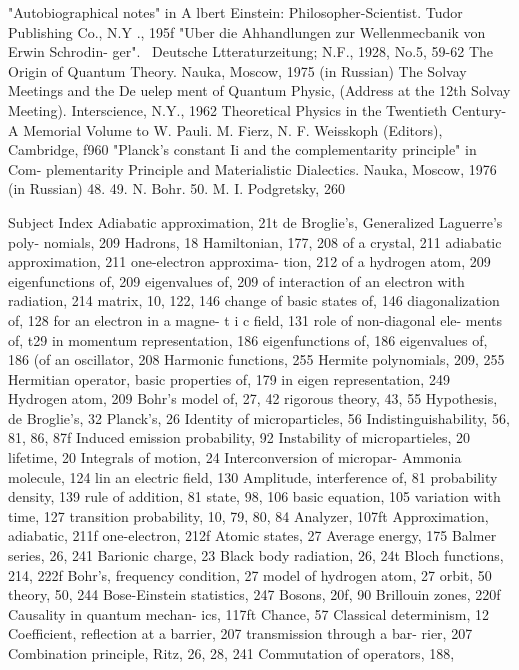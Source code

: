 \documentclass[a4paper,sfsidenotes,colorlinks=true]{tufte-book}
\numberwithin{equation}{section}
\numberwithin{figure}{section}
\begin{document}
{{{{{{{"Autobiographical notes" in A lbert Einstein: Philosopher-Scientist. Tudor	Publishing	Co.,	N.Y .,	195f
"Uber die Ahhandlungen zur Wellenmecbanik von Erwin Schrodin- ger".~ Deutsche Ltteraturzeitung; N.F., 1928, No.5, 59-62
The Origin of Quantum Theory. Nauka, Moscow, 1975 (in Russian) The	Solvay	Meetings	and	the	De uelep ment	of	Quantum	Physic,
(Address at the 12th Solvay Meeting). Interscience, N.Y., 1962
Theoretical Physics in the Twentieth Century-A Memorial Volume to W. Pauli. M. Fierz, N. F. Weisskoph (Editors), Cambridge, f960
"Planck's constant Ii and the complementarity principle" in Com- plementarity Principle and Materialistic Dialectics. Nauka, Moscow, 1976 (in Russian)
48.
49.
N.	Bohr.
50. M. I. Podgretsky,
260

\cleardoublepage
Subject Index
Adiabatic approximation, 21t de Broglie's,
Generalized Laguerre's poly- nomials, 209
Hadrons, 18 Hamiltonian, 177, 208
of a crystal, 211 adiabatic	approximation,
211 one-electron approxima-
tion, 212 of a hydrogen atom, 209
eigenfunctions of, 209
eigenvalues of, 209 of interaction of an electron
with radiation, 214 matrix, 10, 122, 146
change of basic states of, 146
diagonalization of, 128 for an electron in a magne-
t i c	field,	131 role of non-diagonal ele- ments of, t29
in momentum representation, 186
eigenfunctions of, 186
eigenvalues of, 186 (of an oscillator, 208
Harmonic functions, 255 Hermite polynomials, 209, 255 Hermitian operator,
basic properties of, 179
in eigen representation, 249 Hydrogen atom, 209
Bohr's model of, 27, 42
rigorous theory, 43, 55 Hypothesis,
de Broglie's, 32 Planck's, 26
Identity of microparticles, 56 Indistinguishability, 56, 81, 86,
87f
Induced emission probability,
92
Instability of micropartieles, 20 lifetime, 20
Integrals of motion, 24 Interconversion of micropar-
Ammonia molecule, 124 lin an electric field, 130
Amplitude, interference of, 81 probability density, 139 rule of addition, 81 state, 98, 106
basic equation, 105
variation with time, 127 transition probability, 10, 79,
80, 84 Analyzer, 107ft
Approximation, adiabatic, 211f one-electron, 212f
Atomic states, 27 Average energy, 175
Balmer series, 26, 241 Barionic charge, 23 Black body radiation, 26, 24t Bloch functions, 214, 222f Bohr's,
frequency condition, 27 model of hydrogen atom, 27 orbit, 50 theory, 50, 244
Bose-Einstein statistics, 247 Bosons, 20f, 90 Brillouin zones, 220f
Causality in quantum mechan- ics, 117ft
Chance, 57 Classical determinism, 12 Coefficient,
reflection at a barrier, 207 transmission through a bar-
rier, 207 Combination principle, Ritz,
26, 28, 241 Commutation of operators, 188,
}}}}}}}
\end{document}
